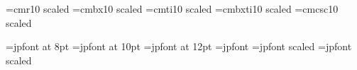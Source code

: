 \makeatletter

\font\elevenrm=cmr10 scaled \magstephalf %
\font\elevenbf=cmbx10 scaled \magstephalf
\font\elevenit=cmti10 scaled \magstephalf
\font\elevenbi=cmbxti10 scaled \magstephalf
\font\elevensc=cmcsc10 scaled \magstephalf

\font\jpeight=jpfont at 8pt
\font\jpten=jpfont at 10pt
\font\jptwelve=jpfont at 12pt
\font\jpfrt=jpfont
\font\jpsvt=jpfont scaled 
\font\jptwty=jpfont scaled 

\newdimen\jpsiz@
\newdimen\jp@xshift
\newdimen\jp@yshift
\newdimen\ulin@dist

\newif\ifc@ntinu@
\c@ntinu@false

\let\jpnorfont\jpfrt
\let\jpfont\jpnorfont

\def\set@Largenotesize{\let\musixfont\musicLargefont
  \let\jpfont\jpLargefont
  \b@amthick.3456\Interligne \interbeam1.08\Interligne }

\def\set@largenotesize{\let\musixfont\musiclargefont
  \let\jpfont\jplargefont
  \b@amthick.288\Interligne \interbeam.9\Interligne }

\def\set@normalnotesize{\let\musixfont\musicnorfont
  \let\jpfont\jpnorfont
  \b@amthick.24\Interligne \interbeam\p@seven5\Interligne }

\def\set@smallnotesize{\let\musixfont\musicsmallfont
  \let\jpfont\jpsmallfont
  \b@amthick\p@ne92\Interligne \interbeam.6\Interligne }

\def\set@tinynotesize{\let\musixfont\musictinyfont
  \let\jpfont\jptinyfont
  \b@amthick\p@ne536\Interligne \interbeam.48\Interligne }


